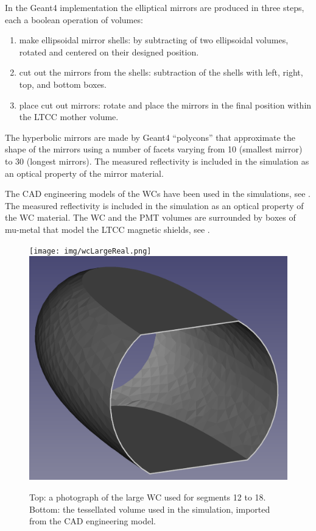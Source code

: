 In the Geant4 implementation the elliptical mirrors are produced in three steps, each a boolean operation of volumes:

\begin{enumerate}
	\item make ellipsoidal mirror shells: by subtracting of two ellipsoidal volumes, rotated and centered on their designed position.
	\item cut out the mirrors from the shells: subtraction of the shells with left, right, top, and bottom boxes.
	\item place cut out mirrors: rotate and place the mirrors in the final position within the LTCC mother volume.
\end{enumerate}

The hyperbolic mirrors are made by Geant4 ``polycons'' that approximate the shape of the mirrors using a number of facets
varying from 10 (smallest mirror) to 30 (longest mirrors). The measured reflectivity is included in the simulation as
an optical property of the mirror material.

The CAD engineering models of the WCs have been used in the simulations, see .
The measured reflectivity is included in the simulation as an optical property of the WC material.
The WC and the PMT volumes are surrounded by boxes of mu-metal that model the LTCC magnetic shields, see .

\begin{figure}
	\centering
	\texttt{[image: img/wcLargeReal.png]}
	\includegraphics[width=0.99\columnwidth,keepaspectratio]{img/wcLargeSim.png}
	\caption{Top: a photograph of the large WC used for segments 12 to 18. Bottom: the tessellated volume used in the
            simulation, imported from the CAD engineering model.}
	\label{fig:wcSimulation}
\end{figure}

